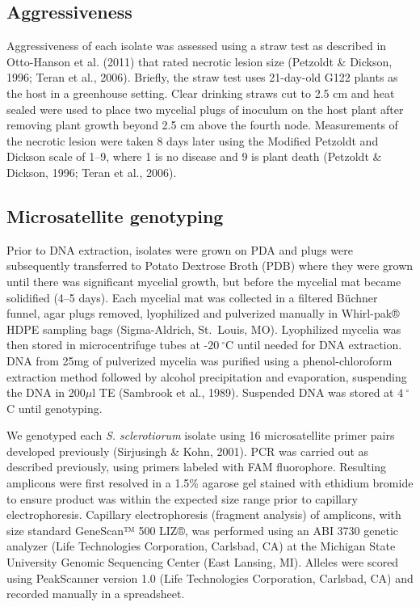 \documentclass[fleqn,10pt,lineno]{wlpeerj} %
\theoremstyle{definition}
\theoremstyle{definition}
\theoremstyle{definition}
\theoremstyle{remark}
\begin{document}
\subsection*{Aggressiveness}\label{aggressiveness}

Aggressiveness of each isolate was assessed using a straw test as
described in Otto-Hanson et al. (2011) that rated necrotic lesion size
(Petzoldt \& Dickson, 1996; Teran et al., 2006). Briefly, the straw test
uses 21-day-old G122 plants as the host in a greenhouse setting. Clear
drinking straws cut to 2.5 cm and heat sealed were used to place two
mycelial plugs of inoculum on the host plant after removing plant growth
beyond 2.5 cm above the fourth node. Measurements of the necrotic lesion
were taken 8 days later using the Modified Petzoldt and Dickson scale of
1--9, where 1 is no disease and 9 is plant death (Petzoldt \& Dickson,
1996; Teran et al., 2006).

\subsection*{Microsatellite genotyping}\label{microsatellite-genotyping}

Prior to DNA extraction, isolates were grown on PDA and plugs were
subsequently transferred to Potato Dextrose Broth (PDB) where they were
grown until there was significant mycelial growth, but before the
mycelial mat became solidified (4--5 days). Each mycelial mat was
collected in a filtered Büchner funnel, agar plugs removed, lyophilized
and pulverized manually in Whirl-pak® HDPE sampling bags (Sigma-Aldrich,
St.~Louis, MO). Lyophilized mycelia was then stored in microcentrifuge
tubes at -\(20~^{\circ}\)C until needed for DNA extraction. DNA from
25mg of pulverized mycelia was purified using a phenol-chloroform
extraction method followed by alcohol precipitation and evaporation,
suspending the DNA in 200\(\mu\)l TE (Sambrook et al., 1989). Suspended
DNA was stored at \(4~^{\circ}\)C until genotyping.

We genotyped each \emph{S. sclerotiorum} isolate using 16 microsatellite
primer pairs developed previously (Sirjusingh \& Kohn, 2001). PCR was
carried out as described previously, using primers labeled with FAM
fluorophore. Resulting amplicons were first resolved in a 1.5\% agarose
gel stained with ethidium bromide to ensure product was within the
expected size range prior to capillary electrophoresis. Capillary
electrophoresis (fragment analysis) of amplicons, with size standard
GeneScan™ 500 LIZ®, was performed using an ABI 3730 genetic analyzer
(Life Technologies Corporation, Carlsbad, CA) at the Michigan State
University Genomic Sequencing Center (East Lansing, MI). Alleles were
scored using PeakScanner version 1.0 (Life Technologies Corporation,
Carlsbad, CA) and recorded manually in a spreadsheet.
\end{document}
